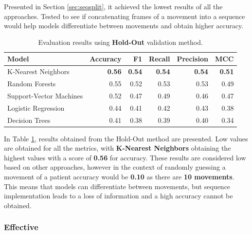                 Presented in Section \ref{sec:seqsplit}, it achieved the lowest results of all the approaches. Tested to see if concatenating frames of a movement into a sequence would help models differentiate between movements and obtain higher accuracy. 
                
                \begin{table}[htbp]
                    \centering
                    \caption{Evaluation results using \textbf{Hold-Out} validation method.}
                    \label{tab:sequence_approach_holdout}
                    \begin{tabular}{lrrrrr}
                        \toprule
                        \textbf{Model} & \textbf{Accuracy} & \textbf{F1} & \textbf{Recall} & \textbf{Precision} & \textbf{MCC} \\
                        \midrule
                        K-Nearest Neighbors & \textbf{0.56} & \textbf{0.54} & \textbf{0.54} & \textbf{0.54} & \textbf{0.51} \\
                        Random Forests & 0.55 & 0.52 & 0.53 & 0.53 & 0.49 \\
                        Support-Vector Machines& 0.52 & 0.47 & 0.49 & 0.46 & 0.47 \\
                        Logistic Regression & 0.44 & 0.41 & 0.42 & 0.43 & 0.38 \\
                        Decision Trees & 0.41 & 0.38 & 0.39 & 0.40 & 0.34 \\
                        \bottomrule
                    \end{tabular}
                \end{table}

                In Table \ref{tab:sequence_approach_holdout}, results obtained from the Hold-Out method are presented. Low values are obtained for all the metrics, with \textbf{K-Nearest Neighbors} obtaining the highest values with a score of \textbf{0.56} for accuracy. These results are considered low based on other approaches, however in the context of randomly guessing a movement of a patient accuracy would be \textbf{0.10} as there are \textbf{10 movements}. This means that models can differentiate between movements, but sequence implementation leads to a loss of information and a high accuracy cannot be obtained.

        \subsubsection{Effective}

